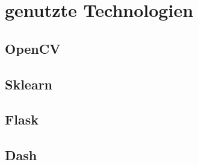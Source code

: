 \section{genutzte Technologien}

\subsection{OpenCV}

\subsection{Sklearn}

\subsection{Flask}

\subsection{Dash}
